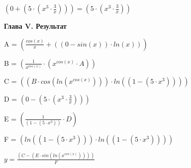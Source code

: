 \documentclass[12pt,a4paper,fleqn]{article}
\begin{document}
\begin{center}
$(0 + (5 \cdot (x^{3} \cdot \frac{3}{x}))) = (5 \cdot (x^{3} \cdot \frac{3}{x}))$\end{center}
\newpage \textbf{\LARGE Глава V. Результат}

\begin{center}
A = $(\frac{cos(x)}{x} + ((0 - sin(x)) \cdot ln(x)))$\end{center}
\begin{center}
B = $(\frac{1}{x^{cos(x)}} \cdot (x^{cos(x)} \cdot A))$\end{center}
\begin{center}
C = $((B \cdot cos(ln(x^{cos(x)}))) \cdot ln((1 - (5 \cdot x^{3}))))$\end{center}
\begin{center}
D = $(0 - (5 \cdot (x^{3} \cdot \frac{3}{x})))$\end{center}
\begin{center}
E = $(\frac{1}{(1 - (5 \cdot x^{3}))} \cdot D)$\end{center}
\begin{center}
F = $(ln((1 - (5 \cdot x^{3}))) \cdot ln((1 - (5 \cdot x^{3}))))$\end{center}
$y = $$\frac{(C - (E \cdot sin(ln(x^{cos(x)}))))}{F}$
\end{document}
